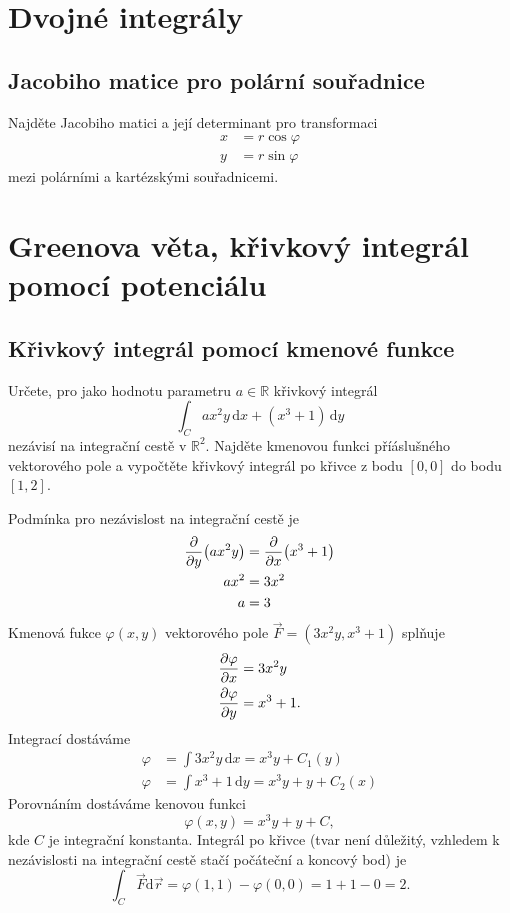 \section{Dvojné integrály}


\subsection{Jacobiho matice pro polární souřadnice}

Najděte Jacobiho matici a její determinant pro transformaci 
\begin{equation*}
  \begin{aligned}
    x&=r\cos \varphi\\
    y&=r\sin \varphi
  \end{aligned}
\end{equation*}
mezi polárními a kartézskými souřadnicemi.


\section{Greenova věta, křivkový integrál pomocí potenciálu}

\subsection{Křivkový integrál pomocí kmenové funkce}

Určete, pro jako hodnotu parametru $a\in \mathbb R$ křivkový integrál $$\int_C ax^2y\,\mathrm dx+(x^3+1)\,\mathrm dy$$ nezávisí na integrační cestě v $\mathbb R^2$. Najděte kmenovou funkci příáslušného vektorového pole a vypočtěte křivkový integrál po křivce z bodu $[0,0]$ do bodu $[1,2]$.

\reseni

Podmínka pro nezávislost na integrační cestě je $$
\begin{aligned}
  \pdv{y}(ax^2y)&=\pdv{x}(x^3+1)\\
  ax^2&=3x^2\\
  a&=3
\end{aligned}
$$
Kmenová fukce $\varphi(x,y)$ vektorového pole $\vec F=(3x^2y,x^3+1)$ splňuje
$$
\begin{aligned}
  \pdv{\varphi}{x}&=3x^2y \\  \pdv{\varphi}{y}&=x^3+1.
\end{aligned}
$$
Integrací dostáváme
$$
\begin{aligned}
  \varphi &= \int 3x^2y\,\mathrm dx=x^3y+C_1(y)\\
  \varphi &= \int x^3+1\,\mathrm dy=x^3y+y+C_2(x)
\end{aligned}
$$
Porovnáním dostáváme kenovou funkci $$\varphi (x,y)=x^3y+y+C,$$ kde $C$ je integrační konstanta. Integrál po křivce (tvar není důležitý, vzhledem k nezávislosti na integrační cestě stačí počáteční a koncový bod) je
$$\int _C \vec F\mathrm d\vec r=\varphi(1,1)-\varphi(0,0)=1+1-0=2.$$

